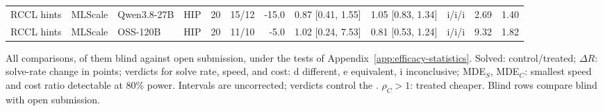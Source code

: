 \begin{widetable}[!p]
\begin{tabular}{@{}llllrrrlllrr@{}}
RCCL hints & MLScale & Qwen3.8-27B & HIP & 20 & 15/12 & -15.0 & 0.87 [0.41, 1.55] & 1.05 [0.83, 1.34] & i/i/i & 2.69 & 1.40 \\
RCCL hints & MLScale & OSS-120B & HIP & 20 & 11/10 & -5.0 & 1.02 [0.24, 7.53] & 0.81 [0.53, 1.24] & i/i/i & 9.32 & 1.82 \\
\bottomrule
\end{tabular}
\caption{All  comparisons,  of them blind against open submission,  under the tests of Appendix~\ref{app:efficacy-statistics}. Solved: control/treated; $\Delta R$: solve-rate change in points; verdicts for solve rate, speed, and cost: d different, e equivalent, i inconclusive; MDE$_S$, MDE$_C$: smallest speed and cost ratio detectable at 80\% power. Intervals are uncorrected; verdicts control the . $\rho_C>1$: treated cheaper. Blind rows compare blind with open submission.}
\label{tab:all-comparisons}
\revend\end{widetable}
